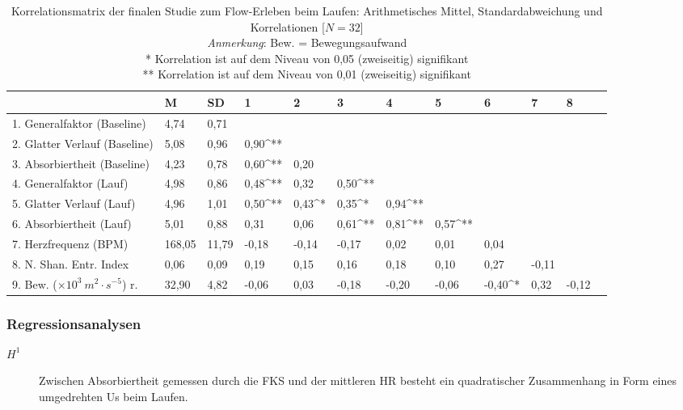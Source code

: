 \begin{sidewaystable}
\centering
	\caption[Korrelationsmatrix (Studie: Laufen)]{Korrelationsmatrix der finalen Studie zum Flow-Erleben beim Laufen: Arithmetisches Mittel, Standardabweichung und Korrelationen [$N = 32$] \\ \hspace{\textwidth}\emph{Anmerkung}: Bew. = Bewegungsaufwand \\ \hspace{\textwidth}* Korrelation ist auf dem Niveau von 0,05 (zweiseitig) signifikant \\ \hspace{\textwidth}** Korrelation ist auf dem Niveau von 0,01 (zweiseitig) signifikant}
	\label{tab:korrelation_studie_laufen}
	\begin{tabular}{lxxxxxxxxxxx}
\toprule
& M & SD & 1 & 2 & 3 & 4 & 5 & 6 & 7 & 8 \\
. Generalfaktor (Baseline) & 4,74 & 0,71 & & & & & & & & \\
	2. Glatter Verlauf (Baseline) & 5,08 & 0,96 & 0,90^{**} & & & & & & & \\
	3. Absorbiertheit (Baseline) & 4,23 & 0,78 & 0,60^{**} & 0,20 & & & & & & \\
	4. Generalfaktor (Lauf) & 4,98 & 0,86 & 0,48^{**} & 0,32 & 0,50^{**} & & & & & \\
	5. Glatter Verlauf (Lauf) & 4,96 & 1,01 & 0,50^{**} & 0,43^{*} & 0,35^{*} & 0,94^{**} & & & & \\
	6. Absorbiertheit (Lauf) & 5,01 & 0,88 & 0,31 & 0,06 & 0,61^{**} & 0,81^{**} & 0,57^{**} & & & \\
	7. Herzfrequenz (BPM) & 168,05 & 11,79 & -0,18 & -0,14 & -0,17 & 0,02 & 0,01 & 0,04 & & \\
	8. N. Shan. Entr. Index & 0,06 & 0,09 & 0,19 & 0,15 & 0,16 & 0,18 & 0,10 & 0,27 & -0,11 & \\
	9. Bew. ($\times 10^3 \: m^2 \cdot s^{-5}$) r. & 32,90 & 4,82 & -0,06 & 0,03 & -0,18 & -0,20 & -0,06 & -0,40^{*} & 0,32 & -0,12 \\
\bottomrule
\end{tabular}
\end{sidewaystable}

\subsubsection{Regressionsanalysen}
\label{ssub:regressionsanalysen}

\begin{description}
	\item[$H^1$] Zwischen Absorbiertheit gemessen durch die \ac{FKS} und der mittleren \ac{HR} besteht ein quadratischer Zusammenhang in Form eines umgedrehten Us beim Laufen.
\end{description}

